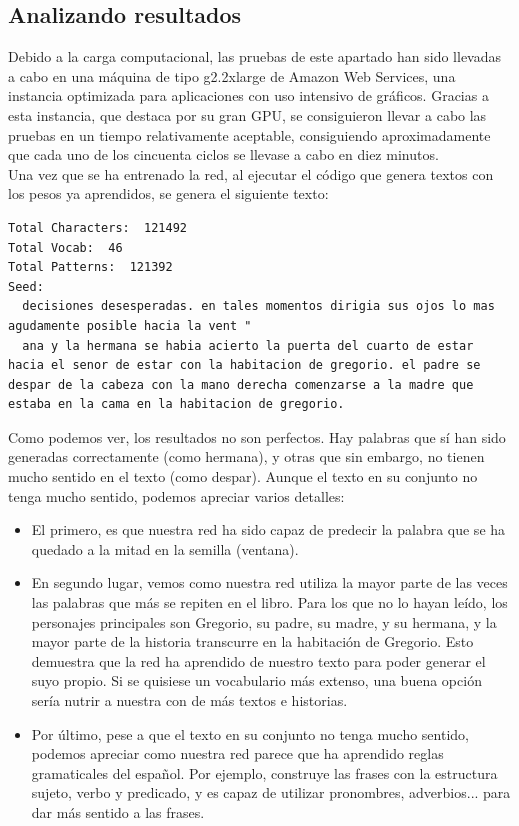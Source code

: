 \subsection{Analizando resultados}
Debido a la carga computacional, las pruebas de este apartado han sido llevadas a cabo en una máquina de tipo g2.2xlarge de Amazon Web Services, una instancia optimizada para aplicaciones con uso intensivo de gráficos. Gracias a esta instancia, que destaca por su gran GPU, se consiguieron llevar a cabo las pruebas en un tiempo relativamente aceptable, consiguiendo aproximadamente que cada uno de los cincuenta ciclos se llevase a cabo en diez minutos.\\
Una vez que se ha entrenado la red, al ejecutar el código que genera textos con los pesos ya aprendidos, se genera el siguiente texto:
\begin{lstlisting}
Total Characters:  121492
Total Vocab:  46
Total Patterns:  121392
Seed:
  decisiones desesperadas. en tales momentos dirigia sus ojos lo mas agudamente posible hacia la vent "
  ana y la hermana se habia acierto la puerta del cuarto de estar hacia el senor de estar con la habitacion de gregorio. el padre se despar de la cabeza con la mano derecha comenzarse a la madre que estaba en la cama en la habitacion de gregorio.
\end{lstlisting}
Como podemos ver, los resultados no son perfectos. Hay palabras que sí han sido generadas correctamente (como hermana), y otras que sin embargo, no tienen mucho sentido en el texto (como despar). Aunque el texto en su conjunto no tenga mucho sentido, podemos apreciar varios detalles:
\begin{itemize}[noitemsep]
\item El primero, es que nuestra red ha sido capaz de predecir la palabra que se ha quedado a la mitad en la semilla (ventana).
\item En segundo lugar, vemos como nuestra red utiliza la mayor parte de las veces las palabras que más se repiten en el libro. Para los que no lo hayan leído, los personajes principales son Gregorio, su padre, su madre, y su hermana, y la mayor parte de la historia transcurre en la habitación de Gregorio. Esto demuestra que la red ha aprendido de nuestro texto para poder generar el suyo propio. Si se quisiese un vocabulario más extenso, una buena opción sería nutrir a nuestra con de más textos e historias.
\item Por último, pese a que el texto en su conjunto no tenga mucho sentido, podemos apreciar como nuestra red parece que ha aprendido reglas gramaticales del español. Por ejemplo, construye las frases con la estructura sujeto, verbo y predicado, y es capaz de utilizar pronombres, adverbios... para dar más sentido a las frases.
\end{itemize}
